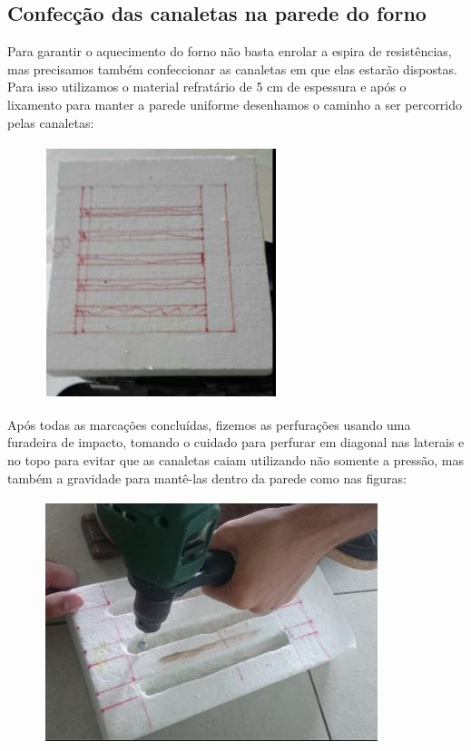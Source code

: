 \subsection{Confecção das canaletas na parede do forno}
Para garantir o aquecimento do forno não basta enrolar a espira de resistências, mas precisamos também confeccionar as canaletas em que elas estarão dispostas. Para isso utilizamos o material refratário de 5 cm de espessura e após o lixamento para manter a parede uniforme desenhamos o caminho a ser percorrido pelas canaletas:
\begin{figure}[H]
	\centering
	\label{foto4}
	\includegraphics[keepaspectratio=true,scale=0.8]{figuras/alimentacao9.JPG}
\end{figure}

Após todas as marcações concluídas, fizemos as perfurações usando uma furadeira de impacto, tomando o cuidado para perfurar em diagonal nas laterais e no topo para evitar que as canaletas caiam utilizando não somente a pressão, mas também a gravidade para mantê-las dentro da parede como nas figuras:
\begin{figure}[H]
	\centering
	\label{foto5}
	\includegraphics[keepaspectratio=true,scale=1.0]{figuras/alimentacao10.JPG}
\end{figure}

